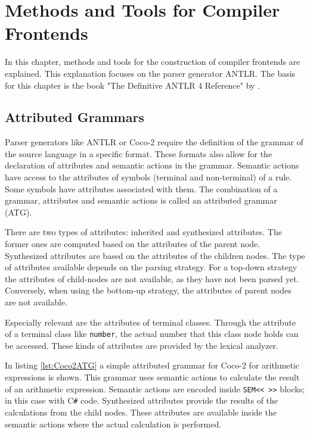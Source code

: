\chapter{Methods and Tools for Compiler Frontends}

In this chapter, methods and tools for the construction of compiler frontends are explained. This explanation focuses on the parser generator ANTLR. The basis for this chapter is the book "The Definitive ANTLR 4 Reference" by \textcite{Antlr4Reference}.

\section{Attributed Grammars}

Parser generators like ANTLR or Coco-2 require the definition of the grammar of the source language in a specific format. These formats also allow for the declaration of attributes and semantic actions in the grammar. Semantic actions have access to the attributes of symbols (terminal and non-terminal) of a rule. Some symbols have attributes associated with them. The combination of a grammar, attributes and semantic actions is called an attributed grammar (ATG).  


There are two types of attributes: inherited and synthesized attributes. The former ones are computed based on the attributes of the parent node. Synthesized attributes are based on the attributes of the children nodes.  
The type of attributes available depends on the parsing strategy. For a top-down strategy the attributes of child-nodes are not available, as they have not been parsed yet. Conversely, when using the bottom-up strategy, the attributes of parent nodes are not available. 

Especially relevant are the attributes of terminal classes. Through the attribute of a terminal class like \texttt{number}, the actual number that this class node holds can be accessed. These kinds of attributes are provided by the lexical analyzer. 

In listing \ref{lst:Coco2ATG} a simple attributed grammar for Coco-2 for arithmetic expressions is shown. This grammar uses semantic actions to calculate the result of an arithmetic expression. Semantic actions are encoded inside \lstinline{SEM<< >>} blocks; in this case with C\verb|#| code. Synthesized attributes provide the results of the calculations from the child nodes. These attributes are available inside the semantic actions where the actual calculation is performed. 

